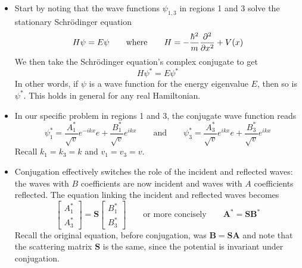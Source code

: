 \documentclass[11pt, a4paper]{article}
\newcommand{\eqtext}[1]{\qquad \text{#1} \qquad}
\newcommand{\schro}{Schr\"{o}dinger\xspace}
\renewcommand{\vec}[1]{\bm{#1}} %
\newcommand{\mat}[1]{\mathbf{#1}} %
\begin{document}
\begin{itemize}
	\item  Start by noting that the wave functions $ \psi_{1,3} $ in regions 1 and 3 solve the stationary \schro equation
	\begin{equation*}
		H \psi = E \psi \eqtext{where} H = -\frac{\hbar^{2}}{m}\pdv[2]{}{x} + V(x)
	\end{equation*}
	We then take the \schro equation's complex conjugate to get
	\begin{equation*}
		H \psi^{*} = E\psi^{*}
	\end{equation*}
	In other words, if $ \psi $ is a wave function for the energy eigenvalue $ E $, then so is $ \psi^{*} $. This holds in general for any real Hamiltonian. 
	
	\item In our specific problem in regions 1 and 3, the conjugate wave function reads
	\begin{equation*}
		\psi_{1}^{*} = \frac{A_{1}^{*}}{\sqrt{v}}e^{-ikx} e + \frac{B_{1}^{*}}{\sqrt{v}}e^{ikx} \eqtext{and} \psi_{3}^{*} = \frac{A_{3}^{*}}{\sqrt{v}}e^{ikx} e + \frac{B_{3}^{*}}{\sqrt{v}}e^{ikx}
	\end{equation*}
	Recall $ k_{1} = k_{3} = k $ and $ v_{1} = v_{3} = v $.
	
	\item Conjugation effectively switches the role of the incident and reflected waves: the waves with $ B $ coefficients are now incident and waves with $ A $ coefficients reflected. The equation linking the incident and reflected waves becomes
	\begin{equation*}
		\begin{bmatrix}
			A_{1}^{*}\\
			A_{3}^{*} 
		\end{bmatrix}
		= 
		\mat{S}
		\begin{bmatrix}
			B_{1}^{*}\\
			B_{3}^{*}
		\end{bmatrix}
		\eqtext{or more concisely} \vec{A}^{*} = \mat{S} \vec{B}^{*}
	\end{equation*}
	Recall the original equation, before conjugation, was $ \vec{B} = \mat{S} \vec{A} $ and note that the scattering matrix $ \mat{S} $ is the same, since the potential is invariant under conjugation.
	

\end{itemize}
\end{document}
